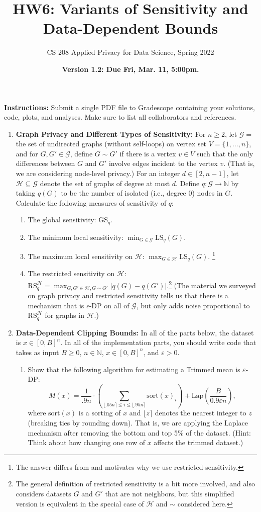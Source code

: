 \documentclass[11pt]{article}
\title{\vspace{-1.5cm} HW6: Variants of Sensitivity and Data-Dependent Bounds}
\author{CS 208 Applied Privacy for Data Science, Spring 2022}
\date{\textbf{Version 1.2: Due Fri, Mar. 11, 5:00pm.}}
\newcommand{\instructions}{\noindent \textbf{Instructions:} Submit a single PDF file to Gradescope containing your solutions, code, plots, and analyses. Make sure to list all collaborators and references.}
\theoremstyle{plain}
\theoremstyle{definition}
\theoremstyle{solution}
\newcommand{\N}{\mathbb{N}}
\newcommand{\eps}{\epsilon}
\newcommand{\cH}{\mathcal{H}}
\newcommand{\cG}{\mathcal{G}}
\newcommand{\GS}{\mathrm{GS}}
\newcommand{\LS}{\mathrm{LS}}
\newcommand{\RS}{\mathrm{RS}}
\newcommand{\sort}{\mathrm{sort}}
\begin{document}
\maketitle

\instructions

\begin{enumerate}[leftmargin=*]

\item \textbf{Graph Privacy and Different Types of Sensitivity:} 
For $n\geq 2$, let $\cG = $ the set of undirected graphs (without self-loops) on vertex set $V=\{1,\ldots,n\}$, and for $G,G'\in \cG$, define $G\sim G'$ if there is a vertex $v\in V$ such that the only differences between $G$ and $G'$ involve edges incident to the vertex $v$.  (That is, we are considering node-level privacy.)
For an integer $d\in [2,n-1]$, let $\cH \subseteq \cG$ denote the set of graphs of degree at most $d$.
Define $q : \cG \rightarrow \N$ by taking $q(G)$ to be the number of isolated (i.e., degree $0$) nodes in $G$.
Calculate the following measures of sensitivity of $q$:
\begin{enumerate}
    \item The global sensitivity: $\GS_q$.
    \item The minimum local sensitivity: $\min_{G\in \cG} \LS_q(G)$.
    \item The maximum local sensitivity on $\cH$: $\max_{G\in \cH} \LS_q(G)$. \footnote{The answer differs from and motivates why we use restricted sensitivity.}
    \item The restricted sensitivity on $\cH$: $\RS_q^{\cH} = \max_{G,G'\in \cH, G\sim G'} |q(G)-q(G')|$.\footnote{The general definition of restricted sensitivity is a bit more involved, and also considers datasets $G$ and $G'$ that are not neighbors, but this simplified version is equivalent in the special case of $\cH$ and $\sim$ considered here.}
    (The material we surveyed on graph privacy and restricted sensitivity tells us that there is a mechanism that is $\eps$-DP on all of $\cG$, but only adds noise proportional to $\RS_q^{\cH}$ for graphs in $\cH$.)
\end{enumerate}

\item \textbf{Data-Dependent Clipping Bounds:} In all of the parts below, the dataset is $x\in [0,B]^n$.   In all of the implementation parts, you should write
code that takes as input $B\geq 0$, $n\in\mathbb{N}$, $x\in [0,B]^n$, and $\varepsilon>0$.

\begin{enumerate}
\item Show that the following algorithm for estimating a Trimmed mean is $\varepsilon$-DP:
$$M(x) = \frac{1}{.9n}\cdot \left(\sum_{\lfloor .05n \rceil\leq i \leq \lfloor .95n \rceil} \sort(x)_i\right) +\mathrm{Lap}\left(\frac{B}{0.9\varepsilon n}\right),$$
where $\sort(x)$ is a sorting of $x$ and $\lfloor z\rceil$ denotes the nearest integer to $z$ (breaking ties by rounding down).  That is, we are applying the Laplace mechanism after removing the bottom and top 5\% of the dataset.
(Hint: Think about how changing one row of $x$ affects the trimmed dataset.)
\label{part:TrimLap}


\end{enumerate}
\end{enumerate}
\end{document}
